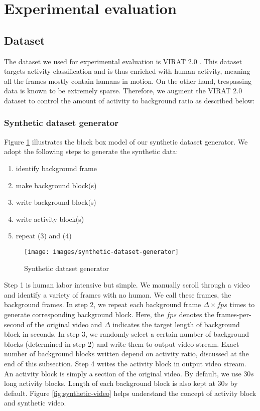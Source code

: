 \section{Experimental evaluation}
\label{sec:exp-eval}
\subsection{Dataset}
The dataset we used for experimental evaluation is VIRAT 2.0 \cite{virat20}. This dataset targets activity classification and is thus enriched with human activity, meaning all the frames mostly contain humans in motion. On the other hand, trespassing data is known to be extremely sparse. Therefore, we augment the VIRAT 2.0 dataset to control the amount of activity to background ratio as described below: 

\vspace{5pt}
\subsubsection{Synthetic dataset generator}
Figure \ref{fig:synthetic-dataset-generator} illustrates the black box model of our synthetic dataset generator. We adopt the following steps to generate the synthetic data: 
\begin{enumerate} 
    \item identify background frame
    \item make background block(s)
    \item write background block(s)
    \item write activity block(s)
    \item repeat (3) and (4)
\end{enumerate}

\begin{figure}
    \centering
    \texttt{[image: images/synthetic-dataset-generator]}
    \caption{Synthetic dataset generator}
    \label{fig:synthetic-dataset-generator}
\end{figure}

Step 1 is human labor intensive but simple. We manually scroll through a video and identify a variety of frames with no human. We call these frames, the background frames. In step 2, we repeat each background frame $\Delta \times fps$ times to generate corresponding background block. Here, the $fps$ denotes the frames-per-second of the original video and $\Delta$ indicates the target length of background block in seconds. In step 3, we randomly select a certain number of  background blocks (determined in step 2) and write them to output video stream. Exact number of background blocks written depend on activity ratio, discussed at the end of this subsection. Step 4 writes the activity block in output video stream. An activity block is simply a section of the original video. By default, we use $30s$ long activity blocks. Length of each background block is also kept at $30s$ by default. Figure \ref{fig:synthetic-video} helps understand the concept of activity block and synthetic video.  

